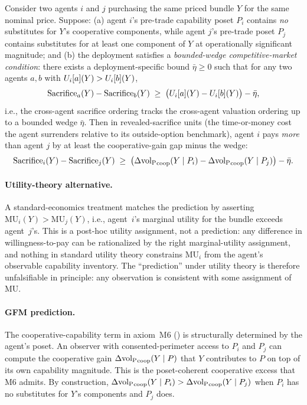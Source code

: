 \begin{prediction}
\label{pred:bundle_completion}
Consider two agents $i$ and $j$ purchasing the same priced bundle
$Y$ for the same nominal price.  Suppose: (a) agent $i$'s
pre-trade capability poset $P_i$ contains \emph{no} substitutes
for $Y$'s cooperative components, while agent $j$'s pre-trade
poset $P_j$ contains substitutes for at least one component of
$Y$ at operationally significant magnitude; and (b) the
deployment satisfies a \emph{bounded-wedge competitive-market
condition}: there exists a deployment-specific bound
$\bar\eta \geq 0$ such that for any two agents $a, b$ with
$U_i[a](Y) > U_i[b](Y)$,
\[
  \mathrm{Sacrifice}_a(Y) - \mathrm{Sacrifice}_b(Y)
  \;\geq\;
  \bigl(U_i[a](Y) - U_i[b](Y)\bigr) - \bar\eta,
\]
i.e., the cross-agent sacrifice ordering tracks the cross-agent
valuation ordering up to a bounded wedge $\bar\eta$.  Then in
revealed-sacrifice units (the time-or-money cost the agent
surrenders relative to its outside-option benchmark), agent $i$
pays \emph{more} than agent $j$ by at least the
cooperative-gain gap minus the wedge:
\[
  \mathrm{Sacrifice}_i(Y) - \mathrm{Sacrifice}_j(Y)
  \;\geq\;
  \bigl(\Delta{\operatorname{vol}_{\mathrm{P}}}_{\mathrm{coop}}(Y \mid P_i)
       - \Delta{\operatorname{vol}_{\mathrm{P}}}_{\mathrm{coop}}(Y \mid P_j)\bigr)
  - \bar\eta.
\]
\end{prediction}

\paragraph{Utility-theory alternative.}
A standard-economics treatment matches the prediction by asserting
$\mathrm{MU}_i(Y) > \mathrm{MU}_j(Y)$, i.e., agent~$i$'s marginal utility
for the bundle exceeds agent~$j$'s.  This is a post-hoc utility
assignment, not a prediction: any difference in willingness-to-pay
can be rationalized by the right marginal-utility assignment, and
nothing in standard utility theory constrains $\mathrm{MU}_i$ from
the agent's observable capability inventory.  The
``prediction'' under utility theory is therefore unfalsifiable in
principle: any observation is consistent with some assignment of
$\mathrm{MU}$.

\paragraph{GFM prediction.}
The cooperative-capability term in axiom~M6
(\citep[Proposition~1]{lasser2026poset}) is structurally determined
by the agent's poset.  An observer with consented-perimeter access
to $P_i$ and $P_j$ can compute the cooperative gain
$\Delta{\operatorname{vol}_{\mathrm{P}}}_{\mathrm{coop}}(Y \mid P)$ that $Y$ contributes to $P$
on top of its own capability magnitude.  This is the poset-coherent
cooperative excess that M6 admits.  By construction,
$\Delta{\operatorname{vol}_{\mathrm{P}}}_{\mathrm{coop}}(Y \mid P_i) >
\Delta{\operatorname{vol}_{\mathrm{P}}}_{\mathrm{coop}}(Y \mid P_j)$ when $P_i$ has no
substitutes for $Y$'s components and $P_j$ does.

